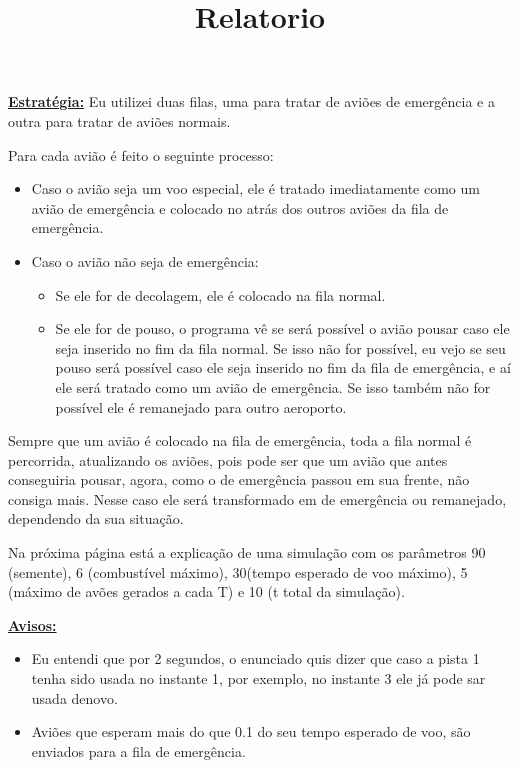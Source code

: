 \documentclass[12pt]{article}
\title{Relatorio}
\author{}
\date{}
\newcommand{\mytitle}[1]{\textbf{\underline{#1}}}
\begin{document}
\maketitle

\mytitle{Estratégia:} Eu utilizei duas filas, uma para tratar de aviões de emergência e a outra para tratar de aviões normais.

Para cada avião é feito o seguinte processo:

\begin{itemize}
\item Caso o avião seja um voo especial, ele é tratado imediatamente como um avião de emergência e colocado no atrás dos outros aviões da fila de emergência.
\item Caso o avião não seja de emergência:
  \begin{itemize}
  \item Se ele for de decolagem, ele é colocado na fila normal.
  \item Se ele for de pouso, o programa vê se será possível o avião pousar caso ele seja inserido no fim da fila normal. Se isso não for possível, eu vejo se seu pouso será possível caso ele seja inserido no fim da fila de emergência, e aí ele será tratado como um avião de emergência. Se isso também não for possível ele é remanejado para outro aeroporto.
  \end{itemize}
\end{itemize}

Sempre que um avião é colocado na fila de emergência, toda a fila normal é percorrida, atualizando os aviões, pois pode ser que um avião que antes conseguiria pousar, agora, como o de emergência passou em sua frente, não consiga mais. Nesse caso ele será transformado em de emergência ou remanejado, dependendo da sua situação.

Na próxima página está a explicação de uma simulação com os parâmetros 90 (semente), 6 (combustível máximo), 30(tempo esperado de voo máximo), 5 (máximo de avões gerados a cada T) e 10 (t total da simulação).

\newpage

\mytitle{Avisos:}
\begin{itemize}
  
\item Eu entendi que por 2 segundos, o enunciado quis dizer que caso a pista 1 tenha sido usada no instante 1, por exemplo, no instante 3 ele já pode sar usada denovo.
\item Aviões que esperam mais do que 0.1 do seu tempo esperado de voo, são enviados para a fila de emergência.
  
\end{itemize}
\end{document}
